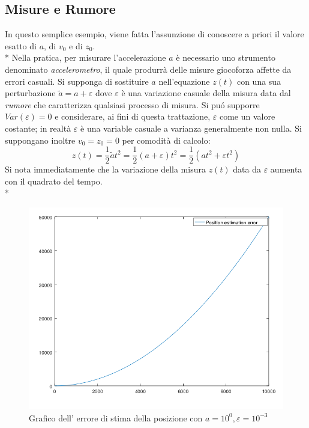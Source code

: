 \subsection{Misure e Rumore}
In questo semplice esempio, viene fatta l'assunzione di conoscere a priori il valore esatto di $a$, di $v_0$ e di $z_0$.\\*
Nella pratica, per misurare l'accelerazione $a$ \`e necessario uno strumento denominato \emph{accelerometro}, il quale produrr\`a delle misure giocoforza affette da errori casuali. Si supponga di sostituire $a$ nell'equazione $z(t)$ con una sua perturbazione $\tilde{a} = a + \varepsilon$ dove $\varepsilon$ \`e una variazione casuale della misura data dal \emph{rumore} che caratterizza qualsiasi processo di misura. Si pu\'o supporre $Var(\varepsilon) = 0$ e considerare, ai fini di questa trattazione, $\varepsilon$ come un valore costante; in realt\`a $\varepsilon$ \`e una variable casuale a varianza generalmente non nulla. Si suppongano inoltre $v_0 = z_0 = 0$ per comodit\`a di calcolo:
$$
z(t) = \frac{1}{2} \tilde{a} t^2 = \frac{1}{2}(a + \varepsilon) t^2 = \frac{1}{2} \left(at^2 + \varepsilon t^2\right)
$$
Si nota immediatamente che la variazione della misura $z(t)$ data da $\varepsilon$ aumenta con il quadrato del tempo.\\*
\begin{figure}[h]
	\centering
	\includegraphics[scale=0.5]{img/errormeas}
	\caption{Grafico dell' errore di stima della posizione con $a = 10^0, \varepsilon = 10^{-3}$}
	\label{fig:errormeas}
\end{figure}\newpage
